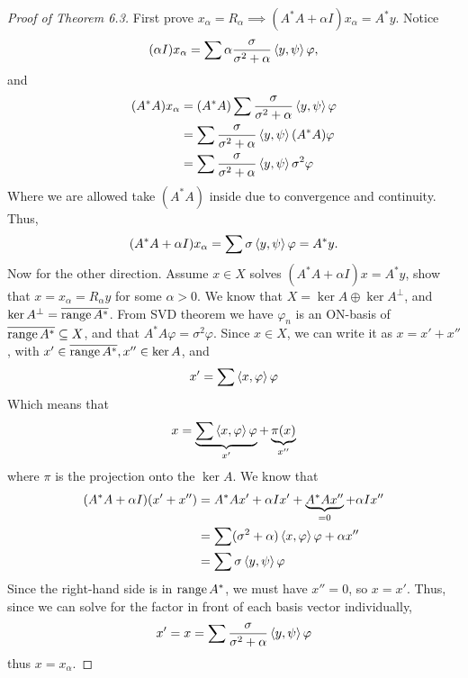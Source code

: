 \documentclass[12pt]{article}
\begin{document}
\begin{proof}[Proof of Theorem 6.3]
    First prove $x_\alpha=R_\alpha\implies (A^*A+\alpha I)x_\alpha = A^*y$. Notice $$(\alpha I)x_\alpha = \sum \alpha \frac{\sigma}{\sigma^2+\alpha}\left\langle y, \psi\right\rangle\varphi,$$ and 
    \begin{equation*}
        \begin{aligned}
            (A^*A)x_\alpha &= (A^*A)\sum \frac{\sigma}{\sigma^2+\alpha}\left\langle y, \psi\right\rangle\varphi\\
            &= \sum \frac{\sigma}{\sigma^2+\alpha}\left\langle y, \psi\right\rangle (A^*A)\varphi\\
            &= \sum \frac{\sigma}{\sigma^2+\alpha}\left\langle y, \psi\right\rangle \sigma^2\varphi
        \end{aligned}
    \end{equation*}
    Where we are allowed take $(A^*A)$ inside due to convergence and continuity. Thus,
    \begin{equation*}
        (A^*A +\alpha I)x_\alpha = \sum {\sigma}\left\langle y, \psi\right\rangle\varphi = A^*y.
    \end{equation*}
    Now for the other direction. Assume $x\in X$ solves $(A^*A + \alpha I)x = A^*y$, show that $x=x_\alpha = R_\alpha y$ for some $\alpha>0$. We know that $X = \ker A \oplus \ker A^\perp$, and $\ker A^\perp=\overline{\operatorname{range} A^*}$. From SVD theorem we have $\varphi_n$ is an ON-basis of $\overline{\operatorname{range} A^*}\subseteq X$, and that $A^*A\varphi=\sigma^2\varphi$. Since $x\in X$, we can write it as $x=x'+x''$, with $x'\in\overline{\operatorname{range} A^*}, x''\in \ker A$, and 
    \begin{equation*}
        x' = \sum \left\langle x, \varphi\right\rangle \varphi
    \end{equation*}
    Which means that 
    \begin{equation*}
        x = \underbrace{\sum \left\langle x, \varphi\right\rangle \varphi}_{x'} + \underbrace{\pi(x)}_{x''}
    \end{equation*}
    where $\pi$ is the projection onto the $\ker A$. We know that 
    \begin{equation*}
        \begin{aligned}
        (A^*A + \alpha I)(x'+x'') &= A^*Ax'+\alpha I x' + \underbrace{A^*Ax''}_{=0} + \alpha I x''\\
        &= \sum (\sigma^2 + \alpha) \left\langle x, \varphi\right\rangle \varphi + \alpha x''\\
        &= \sum \sigma \left\langle y, \psi\right\rangle\varphi
        \end{aligned}
    \end{equation*} 
    Since the right-hand side is in $\operatorname{range} A^*$, we must have $x'' = 0$, so $x=x'$.  Thus, since we can solve for the factor in front of each basis vector individually, 
    \begin{equation*}
        x'=x = \sum \frac{\sigma}{\sigma^2+\alpha} \left\langle y, \psi\right\rangle\varphi
    \end{equation*}
    thus $x=x_\alpha$.
\end{proof}
\end{document}
